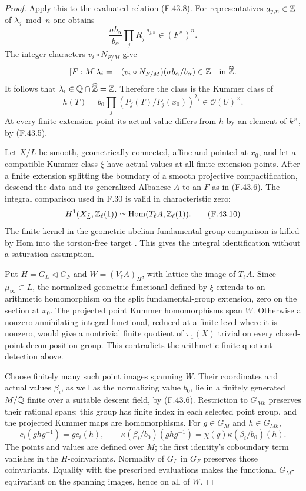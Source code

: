 \begin{proof}
Apply this to the evaluated relation (F.43.8).
For representatives $a_{j,n}\in\mathbb Z$ of
$\lambda_j\bmod n$ one obtains
\[
 \frac{\sigma b_\alpha}{b_\alpha}
       \prod_j R_j^{-a_{j,n}}\in(F^\times)^n .
\]
The integer characters $v_i\circ N_{F/M}$ give
\[
 [F:M]\lambda_i
   =-(v_i\circ N_{F/M})(\sigma b_\alpha/b_\alpha)
       \in\mathbb Z\quad\hbox{in }\widehat{\mathbb Z}.
\]
It follows that
$\lambda_i\in\mathbb Q\cap\widehat{\mathbb Z}=\mathbb Z$.
Therefore the class is the Kummer class of
\[
 h(T)=b_0\prod_j
       \left(P_j(T)/P_j(x_0)\right)^{\lambda_j}
       \in\mathcal O(U)^\times.                             \tag{F.43.9}
\]
At every finite-extension point its actual value
differs from $h$ by an element of $k^\times$,
by (F.43.5).

Let $X/L$ be smooth, geometrically connected, affine
and pointed at $x_0$, and let a compatible Kummer
class $\xi$ have actual values at all finite-extension
points. After a finite extension splitting the
boundary of a smooth projective compactification,
descend the data and its generalized Albanese $A$
to an $F$ as in (F.43.6). The integral comparison
used in F.30 is valid in characteristic zero:
\[
 H^1(X_{\bar L},\mathbb Z_\ell(1))
       \simeq\operatorname{Hom}(T_\ell A,\mathbb Z_\ell(1)).
                                                               \tag{F.43.10}
\]
The finite kernel in the geometric abelian
fundamental-group comparison is killed by Hom
into the torsion-free target
\citep[Propositions~4.1 and~4.3,
Corollary~4.2]{F_SpiessSzamuely2003}.
This gives the integral identification without
a saturation assumption.

Put $H=G_L\triangleleft G_F$ and
$W=(V_\ell A)_H$, with lattice the image of
$T_\ell A$. Since $\mu_\infty\subset L$, the
normalized geometric functional defined by $\xi$
extends to an arithmetic homomorphism on the
split fundamental-group extension, zero on the
section at $x_0$. The projected point Kummer
homomorphisms span $W$. Otherwise a nonzero
annihilating integral functional, reduced
at a finite level where it is nonzero, would
give a nontrivial finite quotient of
$\pi_1(X)$ trivial on every closed-point
decomposition group. This contradicts the
arithmetic finite-quotient detection above.

Choose finitely many such point images spanning
$W$. Their coordinates and actual values
$\beta_i$, as well as the normalizing value
$b_0$, lie in a finitely generated
$M/\mathbb Q$ finite over a suitable descent field,
by (F.43.6). Restriction to $G_{Mk}$ preserves
their rational spans: this group has finite
index in each selected point group, and the
projected Kummer maps are homomorphisms.
For $g\in G_M$ and $h\in G_{Mk}$,
\[
 c_i(ghg^{-1})=g c_i(h),\qquad
 \kappa(\beta_i/b_0)(ghg^{-1})
       =\chi(g)\kappa(\beta_i/b_0)(h).
\]
The points and values are defined over $M$;
the first identity's coboundary term vanishes
in the $H$-coinvariants. Normality of $G_L$
in $G_F$ preserves those coinvariants.
Equality with the prescribed evaluations
makes the functional $G_M$-equivariant on
the spanning images, hence on all of $W$.


\end{proof}
